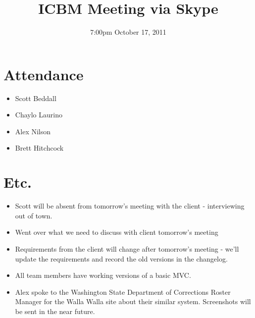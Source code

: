 \documentclass{article}
\begin{document}
\title{ICBM Meeting via Skype}
\date{7:00pm October 17, 2011}
\maketitle

\section{Attendance}
\begin{itemize}
\item Scott Beddall 
\item Chaylo Laurino
\item Alex Nilson
\item Brett Hitchcock
\end{itemize}

\section{Etc.}
\begin{itemize}
\item Scott will be absent from tomorrow's meeting with the client - interviewing out of town.
\item Went over what we need to discuss with client tomorrow's meeting
\item Requirements from the client will change after tomorrow's meeting - we'll update the requirements and record the old versions in the changelog.
\item All team members have working versions of a basic MVC.
\item Alex spoke to the Washington State Department of Corrections Roster Manager for the Walla Walla site about their similar system.  Screenshots will be sent in the near future.
\end{itemize}
 
\end{document}

